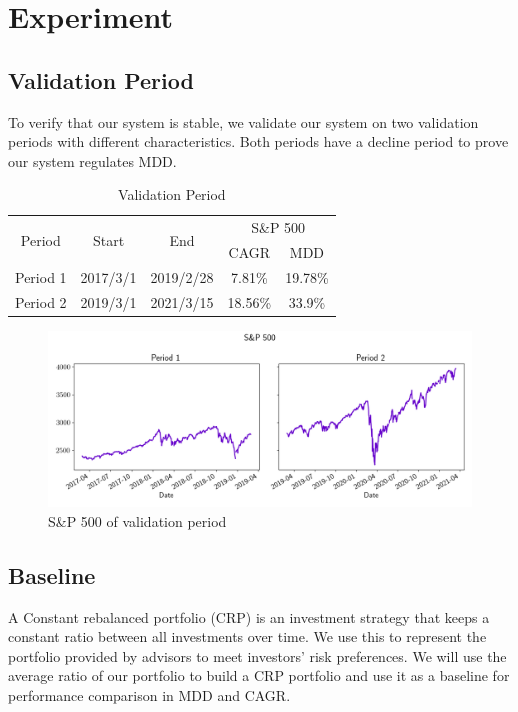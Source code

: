 \section{Experiment}
\subsection{Validation Period}
To verify that our system is stable, we validate our system on two validation periods with different characteristics.  Both periods have a decline period to prove our system regulates MDD.
\begin{table}[htb]
    \centering
    \begin{tabular}{||c|c|c|c|c||}
    \hline \hline
    \multirow{2}{*}{Period} &
    \multirow{2}{*}{Start} &
    \multirow{2}{*}{End} &
    \multicolumn{2}{c|}{S\&P 500} \\ 
    \cline{4-5} &{} &{} & CAGR & MDD \\ \hline \hline
    Period 1 & 2017/3/1 & 2019/2/28 & 7.81\% & 19.78\% \\ \hline
    Period 2 & 2019/3/1 & 2021/3/15 & 18.56\% & 33.9\% \\    
    \hline \hline
    \end{tabular}
    \caption{Validation Period}
    \label{tab:validation_period}
\end{table}
\begin{figure}
    \centering
    \includegraphics[width=15cm]{images/sp500.png}
    \caption{S\&P 500 of validation period}
    \label{fig:my_label}
\end{figure}



\subsection{Baseline}
A Constant rebalanced portfolio (CRP) is an investment strategy that keeps a constant ratio between all investments over time. We use this to represent the portfolio provided by advisors to meet investors' risk preferences. We will use the average ratio of our portfolio to build a CRP portfolio and use it as a baseline for performance comparison in MDD and CAGR.
